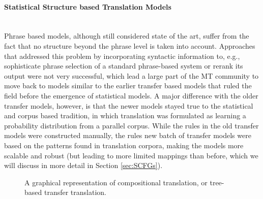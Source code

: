 \documentclass{report}
\newcommand{\myparagraph}[1]{\paragraph{#1}\mbox{}\\}
\theoremstyle{definition}
\theoremstyle{plain}
\begin{document}
\myparagraph{Statistical Structure based Translation Models}
Phrase based models, although still considered state of the art, suffer from the fact that no structure beyond the phrase level is taken into account. Approaches that addressed this problem by incorporating syntactic information to, e.g., sophisticate phrase selection of a standard phrase-based system \citep{koehn2003statistical} or rerank its output \citep{och2004alignment} were not very successful, which lead a large part of the MT community to move back to models similar to the earlier transfer based models that ruled the field before the emergence of statistical models. A major difference with the older transfer models, however, is that the newer models stayed true to the statistical and corpus based tradition, in which translation was formulated as learning a probability distribution from a parallel corpus. While the rules in the old transfer models were constructed manually, the rules new batch of transfer models were based on the patterns found in translation corpora, making the models more scalable and robust (but leading to more limited mappings than before, which we will discuss in more detail in Section \ref{sec:SCFGs}).

\begin{figure}
\centering
{}
\caption{A graphical representation of compositional translation, or tree-based transfer translation.}\label{fig:comptrans}
\end{figure}
\end{document}
